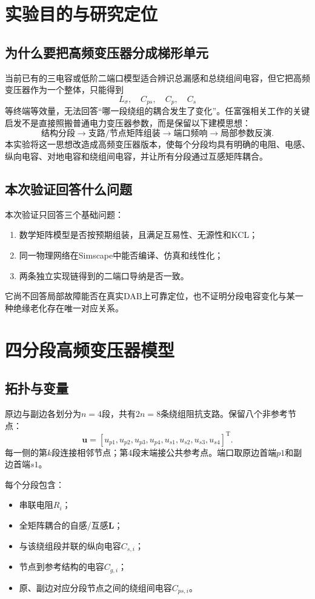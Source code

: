 \documentclass[UTF8,12pt,a4paper]{ctexart}
\newcommand{\Lmat}{\bm{L}}
\begin{document}
\tableofcontents
\newpage

\section{实验目的与研究定位}

\subsection{为什么要把高频变压器分成梯形单元}
当前已有的三电容或低阶二端口模型适合辨识总漏感和总绕组间电容，但它把高频变压器作为一个整体，只能得到
\[
L_{\sigma},\quad C_{ps},\quad C_p,\quad C_s
\]
等终端等效量，无法回答“哪一段绕组的耦合发生了变化”。任富强相关工作的关键启发不是直接照搬普通电力变压器参数，而是保留以下建模思想：
\[
\text{结构分段}\rightarrow
\text{支路/节点矩阵组装}\rightarrow
\text{端口频响}\rightarrow
\text{局部参数反演}.
\]
本实验将这一思想改造成高频变压器版本，使每个分段均具有明确的电阻、电感、纵向电容、对地电容和绕组间电容，并让所有分段通过互感矩阵耦合。

\subsection{本次验证回答什么问题}
本次验证只回答三个基础问题：
\begin{enumerate}
  \item 数学矩阵模型是否按预期组装，且满足互易性、无源性和KCL；
  \item 同一物理网络在Simscape中能否编译、仿真和线性化；
  \item 两条独立实现链得到的二端口导纳是否一致。
\end{enumerate}

它尚不回答局部故障能否在真实DAB上可靠定位，也不证明分段电容变化与某一种绝缘老化存在唯一对应关系。

\section{四分段高频变压器模型}

\subsection{拓扑与变量}
原边与副边各划分为\(n=4\)段，共有\(2n=8\)条绕组阻抗支路。保留八个非参考节点：
\[
\bm{u}=
[u_{p1},u_{p2},u_{p3},u_{p4},u_{s1},u_{s2},u_{s3},u_{s4}]^{\mathrm T}.
\]
每一侧的第\(k\)段连接相邻节点；第4段末端接公共参考点。端口取原边首端\(p1\)和副边首端\(s1\)。

每个分段包含：
\begin{itemize}
  \item 串联电阻\(R_i\)；
  \item 全矩阵耦合的自感/互感\(\Lmat\)；
  \item 与该绕组段并联的纵向电容\(C_{s,i}\)；
  \item 节点到参考结构的电容\(C_{g,i}\)；
  \item 原、副边对应分段节点之间的绕组间电容\(C_{ps,i}\)。
\end{itemize}
\end{document}
